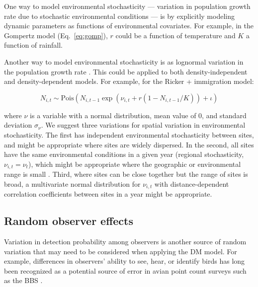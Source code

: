 \documentclass[12pt,english]{article}
\begin{document}
\begin{spacing}{1.9}
\begin{flushleft}
One way to model environmental stochasticity --- variation in population growth
rate due to stochastic environmental conditions --- is by explicitly
modeling dynamic parameters as functions of environmental covariates. %
For example, in the Gompertz model (Eq.~\ref{eq:gomp}), $r$ could be a 
function of temperature  
and $K$ a function of rainfall. 
 
Another way to model environmental stochasticity is as lognormal variation in 
the population growth rate \citep{bjornstad:2001,bonsall_hastings:2004}.  
This could be applied to both density-independent and density-dependent models.
For example, for the Ricker + immigration model:
\begin{linenomath*}
\begin{equation}
N_{i,t} \sim
\mathrm{Pois}(N_{i,t-1}\exp(\nu_{i,t} + r(1-N_{i,t-1}/K)) + \iota)
\label{eq:nuRand}
\end{equation}
\end{linenomath*}
where $\nu$ is a variable with a normal distribution, mean value of 0, and standard deviation $\sigma_\nu$.  
We suggest three variations for spatial variation in environmental stochasticity.  
The first has independent environmental stochasticity 
between sites, and might be appropriate where sites are widely dispersed.  In the second, 
all sites have the same environmental conditions in a given year (regional stochasticity, $\nu_{i,t} = \nu_{t}$),
which might be appropriate where the geographic or environmental range is small \citep{hanski:1998}.  
Third, where sites can be close together but the range of sites is broad, a multivariate normal distribution 
for $\nu_{i,t}$ with distance-dependent correlation coefficients 
between sites in a year might be appropriate.

\subsection*{Random observer effects}

Variation in detection probability among observers is another
source of random variation that may need to be considered when applying
the DM model. For example, differences in observers' ability to see,
hear, or identify birds has long been recognized as a potential source of error
in avian point count surveys such as the BBS 
\citep{robbins_etal:1986,sauer_etal:1994auk,campbell_francis:2011}.


\end{flushleft}
\end{spacing}
\end{document}
